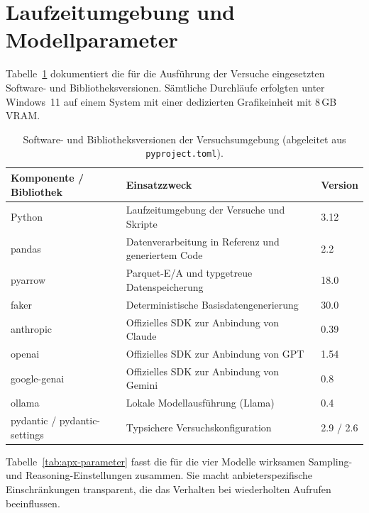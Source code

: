 \section{Laufzeitumgebung und Modellparameter}
\label{apx:umgebung}

Tabelle~\ref{tab:apx-software} dokumentiert die für die Ausführung der Versuche eingesetzten Software- und Bibliotheksversionen. Sämtliche Durchläufe erfolgten unter Windows~11 auf einem System mit einer dedizierten Grafikeinheit mit 8\,GB VRAM.

\begin{table}[htbp]
    \centering
    \small
    \caption[Eingesetzte Software- und Bibliotheksversionen]{Software- und Bibliotheksversionen der Versuchsumgebung (abgeleitet aus \texttt{pyproject.toml}).}
    \label{tab:apx-software}
    \begin{tabularx}{\textwidth}{@{}lXl@{}}
        \toprule
        \textbf{Komponente / Bibliothek} & \textbf{Einsatzzweck} & \textbf{Version} \\
        \midrule
        Python & Laufzeitumgebung der Versuche und Skripte & 3.12 \\
        pandas & Datenverarbeitung in Referenz und generiertem Code & 2.2 \\
        pyarrow & Parquet-E/A und typgetreue Datenspeicherung & 18.0 \\
        faker & Deterministische Basisdatengenerierung & 30.0 \\
        anthropic & Offizielles SDK zur Anbindung von Claude & 0.39 \\
        openai & Offizielles SDK zur Anbindung von GPT & 1.54 \\
        google-genai & Offizielles SDK zur Anbindung von Gemini & 0.8 \\
        ollama & Lokale Modellausführung (Llama) & 0.4 \\
        pydantic / pydantic-settings & Typsichere Versuchskonfiguration & 2.9 / 2.6 \\
        \bottomrule
    \end{tabularx}
\end{table}

Tabelle~\ref{tab:apx-parameter} fasst die für die vier Modelle wirksamen Sampling- und Reasoning-Einstellungen zusammen. Sie macht anbieterspezifische Einschränkungen transparent, die das Verhalten bei wiederholten Aufrufen beeinflussen.


